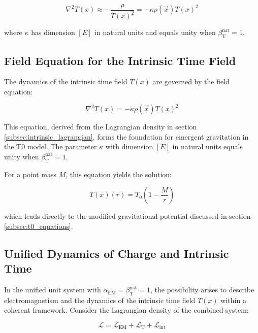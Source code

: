 \documentclass[12pt,a4paper]{article}
\newcommand{\Tfield}{T(x)}
\newcommand{\alphaEM}{\alpha_{\text{EM}}}
\newcommand{\betaT}{\beta_{\text{T}}}
\newcommand{\Tzero}{T_0}
\newcommand{\vecx}{\vec{x}}
\begin{document}
	\begin{equation}
		\nabla^2 \Tfield \approx -\frac{\rho}{\Tfield^2} = -\kappa \rho(\vecx) \Tfield^2
	\end{equation}
	
	where $\kappa$ has dimension $[E]$ in natural units and equals unity when $\betaT^{\text{nat}} = 1$.
	
	\subsection{Field Equation for the Intrinsic Time Field}
	\label{subsec:field_equation_time}
	
	The dynamics of the intrinsic time field $\Tfield$ are governed by the field equation:
	
	\begin{equation}
		\nabla^2 \Tfield = -\kappa \rho(\vecx) \Tfield^2
	\end{equation}
	
	This equation, derived from the Lagrangian density in section \ref{subsec:intrinsic_lagrangian}, forms the foundation for emergent gravitation in the T0 model. The parameter $\kappa$ with dimension $[E]$ in natural units equals unity when $\betaT^{\text{nat}} = 1$.
	
	For a point mass $M$, this equation yields the solution:
	
	\begin{equation}
		\Tfield(r) = \Tzero \left(1 - \frac{M}{r}\right)
	\end{equation}
	
	which leads directly to the modified gravitational potential discussed in section \ref{subsec:t0_equations}.
	
	\subsection{Unified Dynamics of Charge and Intrinsic Time}
	\label{subsec:unified_dynamics}
	
	In the unified unit system with \(\alphaEM = \betaT^{\text{nat}} = 1\), the possibility arises to describe electromagnetism and the dynamics of the intrinsic time field \(\Tfield\) within a coherent framework. Consider the Lagrangian density of the combined system:
	
	\begin{equation}
		\mathcal{L} = \mathcal{L}_{\text{EM}} + \mathcal{L}_{\text{T}} + \mathcal{L}_{\text{int}}
	\end{equation}
	
\end{document}
